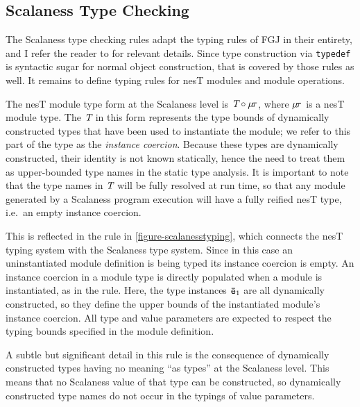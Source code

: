 \subsection{Scalaness Type Checking}
\label{section-scalaness-typing}

\scalanesstypingfig

The Scalaness type checking rules adapt the typing rules of FGJ in their entirety, and I refer
the reader to \cite{FJ} for relevant details. Since type construction via \texttt{typedef} is
syntactic sugar for normal object construction, that is covered by those rules as well. It
remains to define typing rules for nesT modules and module operations.

The nesT module type form at the Scalaness level is $\textit{T} \circ \mu\!\tau$, where
$\mu\!\tau$ is a nesT module type. The $\textit{T}$ in this form represents the type bounds of
dynamically constructed types that have been used to instantiate the module; we refer to this
part of the type as the \emph{instance coercion}. Because these types are dynamically
constructed, their identity is not known statically, hence the need to treat them as
upper-bounded type names in the static type analysis. It is important to note that the type
names in $\textit{T}$ will be fully resolved at run time, so that any module generated by a
Scalaness program execution will have a fully reified nesT type, i.e.~an empty instance
coercion.

This is reflected in the  rule in \autoref{figure-scalanesstyping}, which connects
the nesT typing system with the Scalaness type system. Since in this case an uninstantiated
module definition is being typed its instance coercion is empty. An instance coercion in a
module type is directly populated when a module is instantiated, as in the 
rule. Here, the type instances ${\mathtt{\bar{e}}}_1$ are all dynamically constructed, so they define the
upper bounds of the instantiated module's instance coercion. All type and value parameters are
expected to respect the typing bounds specified in the module definition.

A subtle but significant detail in this rule is the consequence of dynamically constructed types
having no meaning ``as types'' at the Scalaness level. This means that no Scalaness value of
that type can be constructed, so dynamically constructed type names do not occur in the typings
of value parameters. 

